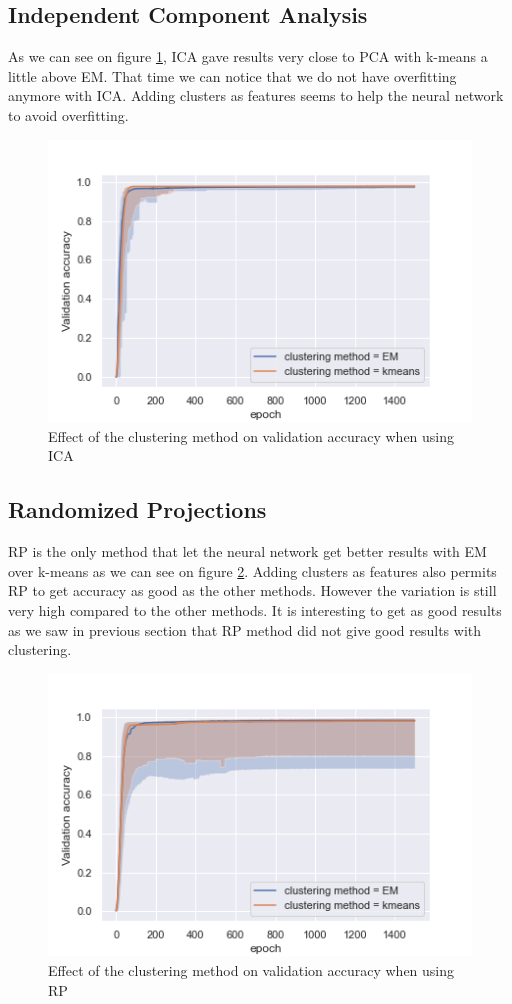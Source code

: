 \documentclass[twocolumn, 10pt]{article}
\begin{document}
		\subsection{Independent Component Analysis}
			As we can see on figure \ref{fig:clusper_ica_cm}, ICA gave results very close to PCA with k-means a little above EM. That time we can notice that we do not have overfitting anymore with ICA. Adding clusters as features seems to help the neural network to avoid overfitting.

			\begin{figure}[h]
				\centering
				\includegraphics[width=0.7\linewidth]{../graphics/clusper_ICA_epoch_val_categorical_accuracy_clustering_method.png}
				\caption{Effect of the clustering method on validation accuracy when using ICA}
				\label{fig:clusper_ica_cm}
			\end{figure}
		\subsection{Randomized Projections}
			RP is the only method that let the neural network get better results with EM over k-means as we can see on figure \ref{fig:clusper_rnd_cm}. Adding clusters as features also permits RP to get accuracy as good as the other methods. However the variation is still very high compared to the other methods. It is interesting to get as good results as we saw in previous section that RP method did not give good results with clustering.

			\begin{figure}[h]
				\centering
				\includegraphics[width=0.7\linewidth]{../graphics/clusper_RP_epoch_val_categorical_accuracy_clustering_method.png}
				\caption{Effect of the clustering method on validation accuracy when using RP}
				\label{fig:clusper_rnd_cm}
			\end{figure}
\end{document}
